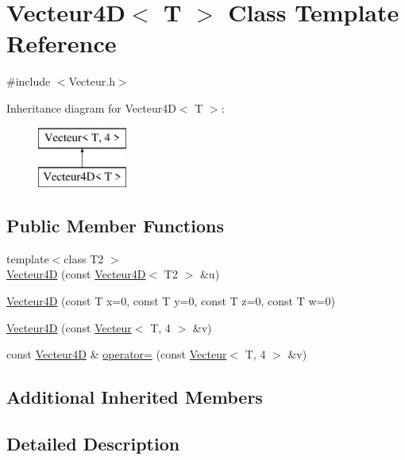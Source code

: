 \hypertarget{class_vecteur4_d}{\section{Vecteur4\-D$<$ T $>$ Class Template Reference}
\label{class_vecteur4_d}
}


{\ttfamily \#include $<$Vecteur.\-h$>$}

Inheritance diagram for Vecteur4\-D$<$ T $>$\-:\begin{figure}[H]
\begin{center}
\leavevmode
\includegraphics[height=2.000000cm]{class_vecteur4_d}
\end{center}
\end{figure}
\subsection*{Public Member Functions}
\begin{DoxyCompactItemize}
\item 
{\footnotesize template$<$class T2 $>$ }\\\hyperlink{class_vecteur4_d_abe5de951c603a937935d74741f2ff1c7}{Vecteur4\-D} (const \hyperlink{class_vecteur4_d}{Vecteur4\-D}$<$ T2 $>$ \&u)
\item 
\hyperlink{class_vecteur4_d_a4618d6ca7db2d1948857229a23d2d591}{Vecteur4\-D} (const T x=0, const T y=0, const T z=0, const T w=0)
\item 
\hyperlink{class_vecteur4_d_ac5eef134308076ea67b501925b55b925}{Vecteur4\-D} (const \hyperlink{class_vecteur}{Vecteur}$<$ T, 4 $>$ \&v)
\item 
const \hyperlink{class_vecteur4_d}{Vecteur4\-D} \& \hyperlink{class_vecteur4_d_a8dc6b5c3450bf06ab168e37fbd910477}{operator=} (const \hyperlink{class_vecteur}{Vecteur}$<$ T, 4 $>$ \&v)
\end{DoxyCompactItemize}
\subsection*{Additional Inherited Members}


\subsection{Detailed Description}
